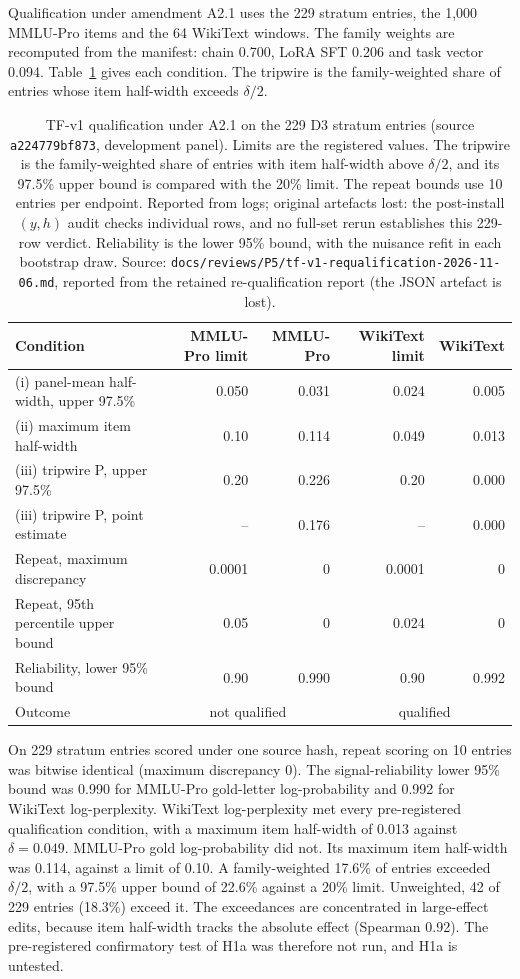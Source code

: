Qualification under amendment A2.1 uses the 229 stratum entries, the 1,000 MMLU-Pro items and the 64 WikiText windows. The family weights are recomputed from the manifest: chain 0.700, LoRA SFT 0.206 and task vector 0.094. Table~\ref{tab:tfqual} gives each condition. The tripwire is the family-weighted share of entries whose item half-width exceeds $\delta/2$.
\begin{table}[t]
\centering
\small
\setlength{\tabcolsep}{4pt}
\begin{tabular}{lrrrr}\toprule
Condition & MMLU-Pro limit & MMLU-Pro & WikiText limit & WikiText \\\midrule
(i) panel-mean half-width, upper 97.5\% & 0.050 & 0.031 & 0.024 & 0.005 \\
(ii) maximum item half-width & 0.10 & 0.114 & 0.049 & 0.013 \\
(iii) tripwire P, upper 97.5\% & 0.20 & 0.226 & 0.20 & 0.000 \\
(iii) tripwire P, point estimate & -- & 0.176 & -- & 0.000 \\
Repeat, maximum discrepancy & 0.0001 & 0 & 0.0001 & 0 \\
Repeat, 95th percentile upper bound & 0.05 & 0 & 0.024 & 0 \\
Reliability, lower 95\% bound & 0.90 & 0.990 & 0.90 & 0.992 \\\midrule
Outcome & \multicolumn{2}{c}{not qualified} & \multicolumn{2}{c}{qualified} \\\bottomrule
\end{tabular}
\caption{TF-v1 qualification under A2.1 on the 229 D3 stratum entries (source \texttt{a224779bf873}, development panel). Limits are the registered values. The tripwire is the family-weighted share of entries with item half-width above $\delta/2$, and its 97.5\% upper bound is compared with the 20\% limit. The repeat bounds use 10 entries per endpoint. Reported from logs; original artefacts lost: the post-install $(y, h)$ audit checks individual rows, and no full-set rerun establishes this 229-row verdict. Reliability is the lower 95\% bound, with the nuisance refit in each bootstrap draw. Source: \texttt{docs/reviews/P5/tf-v1-requalification-2026-11-06.md}, reported from the retained re-qualification report (the JSON artefact is lost).}
\label{tab:tfqual}
\end{table}

On 229 stratum entries scored under one source hash, repeat scoring on 10 entries was bitwise identical (maximum discrepancy 0). The signal-reliability lower 95\% bound was 0.990 for MMLU-Pro gold-letter log-probability and 0.992 for WikiText log-perplexity. WikiText log-perplexity met every pre-registered qualification condition, with a maximum item half-width of 0.013 against $\delta = 0.049$. MMLU-Pro gold log-probability did not. Its maximum item half-width was 0.114, against a limit of 0.10. A family-weighted 17.6\% of entries exceeded $\delta/2$, with a 97.5\% upper bound of 22.6\% against a 20\% limit. Unweighted, 42 of 229 entries (18.3\%) exceed it. The exceedances are concentrated in large-effect edits, because item half-width tracks the absolute effect (Spearman 0.92). The pre-registered confirmatory test of H1a was therefore not run, and H1a is untested.

